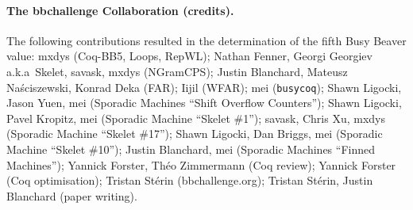 \documentclass[a4paper,british]{article}
\theoremstyle{definition} %
\numberwithin{equation}{section}
\theoremstyle{definition} %
\newcommand{\radofull}{Tibor Rad\'o\xspace}
\newcommand{\CoqBB}{Coq-BB5\xspace}
\begin{document}
\date{}
\maketitle

\begin{abstract}
    We prove that $S(5) = 47,176,870$ using the Coq proof assistant. The Busy Beaver value $S(n)$ is the maximum~number of steps an n-state 2-symbol Turing machine can perform from the all-0 tape before halting and $S$ was historically introduced by \radofull in 1962 as one of the simplest examples of a noncomputable function.  The proof enumerates 181,385,789 Turing machines with 5 states, and, for each machine, decides whether it halts or not.
    Our result marks the first determination of a new Busy Beaver value in over 40 years and the first Busy Beaver value to ever be formally verified, demonstrating the effectiveness of collaborative online research (\url{bbchallenge.org}).
\end{abstract}


\setcounter{tocdepth}{2}
\tableofcontents

\paragraph{The bbchallenge Collaboration (credits).} The following contributions resulted in the determination of the fifth Busy Beaver value: mxdys (\CoqBB, Loops, RepWL); Nathan Fenner, Georgi Georgiev a.k.a~Skelet, savask, mxdys (NGramCPS); Justin Blanchard, Mateusz Naściszewski, Konrad Deka (FAR); Iijil (WFAR); mei (\texttt{busycoq}); Shawn Ligocki, Jason Yuen, mei (Sporadic Machines ``Shift Overflow Counters''); Shawn Ligocki, Pavel Kropitz, mei (Sporadic Machine ``Skelet \#1''); savask, Chris Xu, mxdys (Sporadic Machine ``Skelet \#17''); Shawn Ligocki, Dan Briggs, mei (Sporadic Machine ``Skelet \#10''); Justin Blanchard, mei (Sporadic Machines ``Finned Machines''); Yannick Forster, Théo Zimmermann (Coq review); Yannick Forster (Coq optimisation); Tristan Stérin (bbchallenge.org); Tristan Stérin, Justin Blanchard (paper writing).
\newpage

\begin{center}

\end{center}
\end{document}
